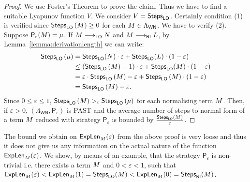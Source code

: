 \begin{proof}
	We use Foster's Theorem to prove the claim. Thus we have to find a suitable Lyapunov function $V$.
	We consider $V=\textsf{Steps}_{\textsf{LO}}$. Certainly condition (1) is verified since $\textsf{Steps}_{\textsf{LO}}\left(M\right)\geq0$ for each $M\in\Lambda_\mathsf{WN}$. We have to verify (2). Suppose $\mathsf{P}_\varepsilon(M)=\mu$. If $M\longrightarrow_{\textsf{LO}}N$ and $M\longrightarrow_{\textsf{RI}}L$, by Lemma~\ref{lemma:derivationlength} we can write:
	\begin{equation*}
	\begin{split}
	\textsf{Steps}_{\textsf{LO}}\left( \mu\right) & = \textsf{Steps}_{\textsf{LO}}(N) \cdot \varepsilon+ \textsf{Steps}_{\textsf{LO}}(L)\cdot (1-\varepsilon)\\
	& \leq \left( \textsf{Steps}_{\textsf{LO}}\left( M\right)-1\right)  \cdot \varepsilon + \textsf{Steps}_{\textsf{LO}}(M)\cdot (1-\varepsilon)\\
	& = \varepsilon\cdot\textsf{Steps}_{\textsf{LO}}\left( M\right)-\varepsilon + \textsf{Steps}_{\textsf{LO}}\left( M\right)\cdot\left( 1-\varepsilon\right)\\
	& = \textsf{Steps}_{\textsf{LO}}\left( M\right)-\varepsilon.
	\end{split}
	\end{equation*}
	Since $0\leq\varepsilon\leq 1$, $\textsf{Steps}_{\textsf{LO}}\left(M\right)>_{\varepsilon}\textsf{Steps}_{\textsf{LO}}\left(\mu\right)$ for each normalising term $M$.
	Then, if $\varepsilon>0$, $(\Lambda_\mathsf{WN},\mathsf{P}_\varepsilon)$ is PAST and the average number of steps to normal form of a term $M$ reduced with strategy $\mathsf{P}_\varepsilon$ is bounded by
	$\frac{\textsf{Steps}_{\textsf{LO}}\left( M\right)}{\varepsilon}$.
\end{proof}
The bound we obtain on $\textsf{ExpLen}_{M}(\varepsilon)$ from the above proof is very loose and thus it does not give us any information on the actual nature of the function $\textsf{ExpLen}_{M}(\varepsilon)$. We show, by means of an example, that the strategy $\mathsf{P}_\varepsilon$ is non-trivial i.e. there exists a term $M$ and $0<\varepsilon<1$, such that $\textsf{ExpLen}_{M}(\varepsilon)<\textsf{ExpLen}_{M}(1)=\textsf{Steps}_{\textsf{LO}}(M)<\textsf{ExpLen}_{M}(0)=\textsf{Steps}_{\textsf{RI}}(M)$.
